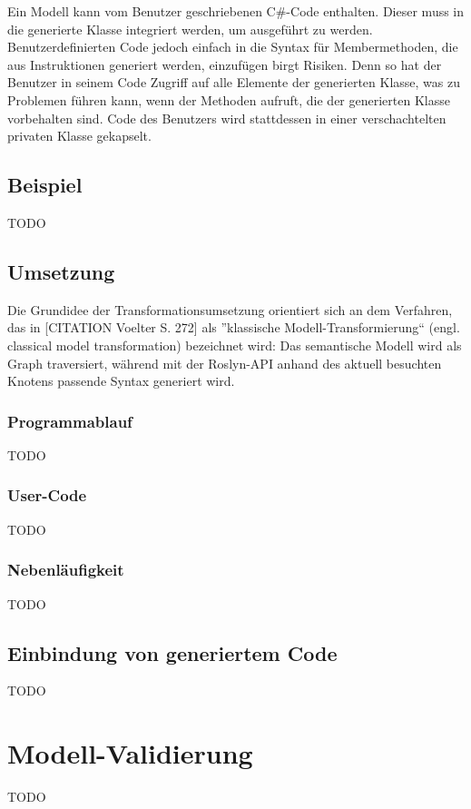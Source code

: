\newline
Ein Modell kann vom Benutzer geschriebenen C\#-Code enthalten. Dieser muss in die generierte Klasse integriert werden, um ausgeführt zu werden. Benutzerdefinierten Code jedoch einfach in die Syntax für Membermethoden, die aus Instruktionen generiert werden,  einzufügen birgt Risiken. Denn so hat der Benutzer in seinem Code Zugriff auf alle Elemente der generierten Klasse, was zu Problemen führen kann, wenn der Methoden aufruft, die der generierten Klasse vorbehalten sind. Code des Benutzers wird stattdessen in einer verschachtelten privaten Klasse gekapselt. 

\subsection{Beispiel}
TODO

\subsection{Umsetzung}
Die Grundidee der Transformationsumsetzung orientiert sich an dem Verfahren, das in [CITATION Voelter S. 272] als ''klassische Modell-Transformierung`` (engl. classical model transformation) bezeichnet wird: Das semantische Modell wird als Graph traversiert, während mit der Roslyn-API anhand des aktuell besuchten Knotens passende Syntax generiert wird.

\subsubsection{Programmablauf}
TODO

\subsubsection{User-Code}
TODO

\subsubsection{Nebenläufigkeit}
TODO

\subsection{Einbindung von generiertem Code}
TODO

\section{Modell-Validierung} 
TODO
